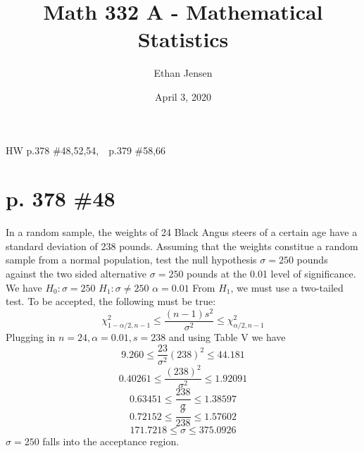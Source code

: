 \documentclass[12pt]{article}
\title{Math 332 A - Mathematical Statistics}
\author{Ethan Jensen}
\date{April 3, 2020}
\begin{document}
	\maketitle HW p.378 \#48,52,54,\ \ p.379 \#58,66
	\section[20pt]{p. 378 \#48}
	In a random sample, the weights of 24 Black Angus steers of a certain age have a standard deviation of 238 pounds. Assuming that the weights constitue a random sample from a normal population, test the null hypothesis \(\sigma = 250\) pounds against the two sided alternative \(\sigma = 250\) pounds at the 0.01 level of significance.
	\newline \newline
	We have
	\newline
	\(H_0: \sigma = 250\)
	\newline
	\(H_1: \sigma \neq 250\)
	\newline
	\(\alpha = 0.01\)
	\newline \newline
	From \(H_1\), we must use a two-tailed test. To be accepted, the following must be true:
	\[\chi^2_{1-\alpha/2, n-1} \leq \frac{(n-1)s^2}{\sigma^2} \leq \chi^2_{\alpha/2, n-1}\]
	Plugging in \(n=24, \alpha = 0.01, s = 238\) and using Table V we have
	\[9.260 \leq \frac{23}{\sigma^2}(238)^2\leq 44.181\]
	\[0.40261 \leq \frac{(238)^2}{\sigma^2} \leq 1.92091\]
	\[0.63451 \leq \frac{238}{\sigma} \leq 1.38597\]
	\[0.72152 \leq \frac{\sigma}{238} \leq 1.57602\]
	\[171.7218 \leq \sigma \leq 375.0926\]
	\(\sigma = 250\) falls into the acceptance region.
	\newline
	\newpage
\end{document}
